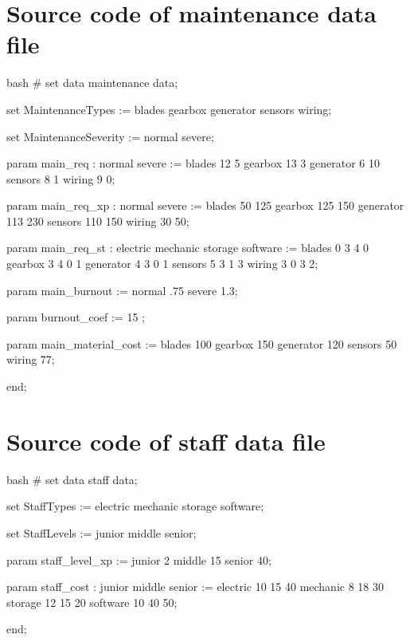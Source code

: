 \section{Source code of maintenance data file}
    \vspace{2pt}
    \begin{boxminted}{bash}
        # set data maintenance
        data;

        set MaintenanceTypes :=
            blades
            gearbox
            generator
            sensors
            wiring;
        
        set MaintenanceSeverity :=
            normal
            severe;
        
        param main_req :
                    normal		severe :=
            blades 12 5
            gearbox 13 3
            generator 6 10
            sensors 8 1
            wiring 9 0;
        
        param main_req_xp :
                    normal severe :=
            blades 50 125
            gearbox 125 150
            generator 113 230
            sensors 110 150
            wiring 30 50;
        
        param main_req_st :
                    electric mechanic storage software :=
            blades 0 3 4 0
            gearbox 3 4 0 1
            generator 4 3 0 1
            sensors 5 3 1 3
            wiring 3 0 3 2;
        
        param main_burnout :=
            normal .75
            severe 1.3;
        
        param burnout_coef := 15 ;
        
        param main_material_cost :=
            blades 100
            gearbox 150
            generator 120
            sensors 50
            wiring 77;

        end;         
    \end{boxminted}
    \newpage

\section{Source code of staff data file}
    \vspace{2pt}
    \begin{boxminted}{bash}
        # set data staff
        data;
        
        set StaffTypes :=
            electric
            mechanic
            storage
            software;
        
        set StaffLevels :=
            junior
            middle
            senior;
        
        param staff_level_xp :=
            junior 2
            middle 15
            senior 40;
        
        param staff_cost :
                    junior middle senior :=
            electric 10 15 40
            mechanic 8 18 30
            storage 12 15 20
            software 10 40 50;
        
        end;     
    \end{boxminted}
    \newpage
